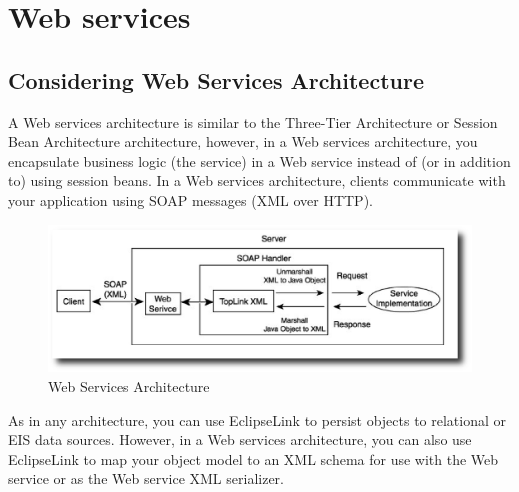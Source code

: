 \section{Web services}
\subsection{Considering Web Services Architecture}
A Web services architecture is similar to the Three-Tier Architecture or Session
Bean Architecture architecture, however, in a Web services architecture, you
encapsulate business logic (the service) in a Web service instead of (or in
addition to) using session beans. In a Web services architecture, clients
communicate with your application using SOAP messages (XML over HTTP).

\begin{figure}
  \begin{center}
  \includegraphics[scale=0.6]{Figures/Web_Service_Arch.eps}
  \end{center}
  \caption{Web Services Architecture}
  \label{Web Services Architecture}
\end{figure}

As in any architecture, you can use EclipseLink to persist objects to relational
or EIS data sources. However, in a Web services architecture, you can also use
EclipseLink to map your object model to an XML schema for use with the Web
service or as the Web service XML serializer.
